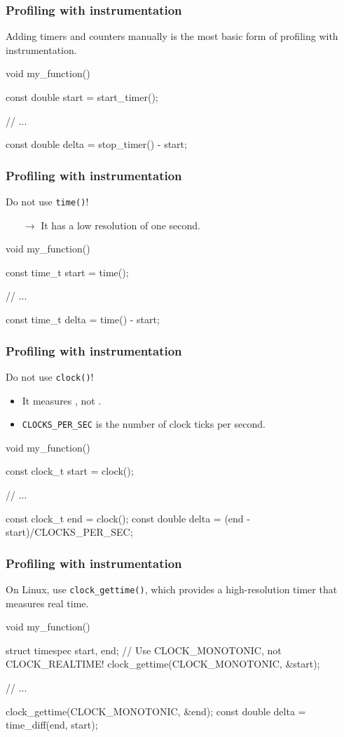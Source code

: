 \documentclass[12pt,t]{beamer}
\let\emph\relax %
\newcommand{\conclude}[1]{%
  \begin{itemize}
    \item[$\rightarrow$]#1
  \end{itemize}
}
\begin{document}
  \begin{frame}[fragile]
    \frametitle{Profiling with instrumentation}

    Adding timers and counters manually is the most basic form of profiling with instrumentation.

    \begin{code}
void my_function()
{
  const double start = start_timer();

  // ...

  const double delta = stop_timer() - start;
}
    \end{code}
  \end{frame}

  \begin{frame}[fragile]
    \frametitle{Profiling with instrumentation}

    Do not use \texttt{time()}!
    \conclude{It has a low resolution of one second.}

    \begin{code}
void my_function()
{
  const time_t start = time();

  // ...

  const time_t delta = time() - start;
}
    \end{code}
  \end{frame}

  \begin{frame}[fragile]
    \frametitle{Profiling with instrumentation}

    Do not use \texttt{clock()}!
    \begin{itemize}
      \item It measures \emph{CPU time}, not \emph{elapsed time}.
      \item \texttt{CLOCKS\_PER\_SEC} is \emph{not} the number of clock ticks per second.
    \end{itemize}

    \begin{code}
void my_function()
{
  const clock_t start = clock();

  // ...

  const clock_t end = clock();
  const double delta = (end - start)/CLOCKS_PER_SEC;
}
    \end{code}
  \end{frame}

  \begin{frame}[fragile]
    \frametitle{Profiling with instrumentation}

    On Linux, use \texttt{clock\_gettime()}, which provides a high-resolution timer that measures real time.

    \begin{code}
void my_function()
{
  struct timespec start, end;
  // Use CLOCK_MONOTONIC, not CLOCK_REALTIME!
  clock_gettime(CLOCK_MONOTONIC, &start);

  // ...

  clock_gettime(CLOCK_MONOTONIC, &end);
  const double delta = time_diff(end, start);
}
    \end{code}
  \end{frame}
\end{document}
